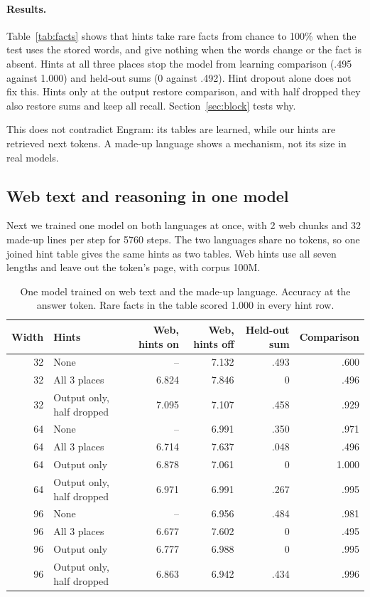 \documentclass[11pt]{article}
\begin{document}
\paragraph{Results.} Table~\ref{tab:facts} shows that hints take rare facts from chance to 100\% when the test uses the stored words, and give nothing when the words change or the fact is absent. Hints at all three places stop the model from learning comparison (.495 against 1.000) and held-out sums (0 against .492). Hint dropout alone does not fix this. Hints only at the output restore comparison, and with half dropped they also restore sums and keep all recall. Section~\ref{sec:block} tests why.

This does not contradict Engram: its tables are learned, while our hints are retrieved next tokens. A made-up language shows a mechanism, not its size in real models.

\subsection{Web text and reasoning in one model}
Next we trained one model on both languages at once, with 2 web chunks and 32 made-up lines per step for 5760 steps. The two languages share no tokens, so one joined hint table gives the same hints as two tables. Web hints use all seven lengths and leave out the token's page, with corpus 100M.

\begin{table}[h]\centering\small
\begin{tabular}{rlrrrr}\toprule
Width & Hints & Web, hints on & Web, hints off & Held-out sum & Comparison\\\midrule
32 & None & -- & 7.132 & .493 & .600\\
32 & All 3 places & 6.824 & 7.846 & 0 & .496\\
32 & Output only, half dropped & 7.095 & 7.107 & .458 & .929\\\midrule
64 & None & -- & 6.991 & .350 & .971\\
64 & All 3 places & 6.714 & 7.637 & .048 & .496\\
64 & Output only & 6.878 & 7.061 & 0 & 1.000\\
64 & Output only, half dropped & 6.971 & 6.991 & .267 & .995\\\midrule
96 & None & -- & 6.956 & .484 & .981\\
96 & All 3 places & 6.677 & 7.602 & 0 & .495\\
96 & Output only & 6.777 & 6.988 & 0 & .995\\
96 & Output only, half dropped & 6.863 & 6.942 & .434 & .996\\\bottomrule
\end{tabular}
\caption{One model trained on web text and the made-up language. Accuracy at the answer token. Rare facts in the table scored 1.000 in every hint row.}\label{tab:mixed}
\end{table}
\end{document}
